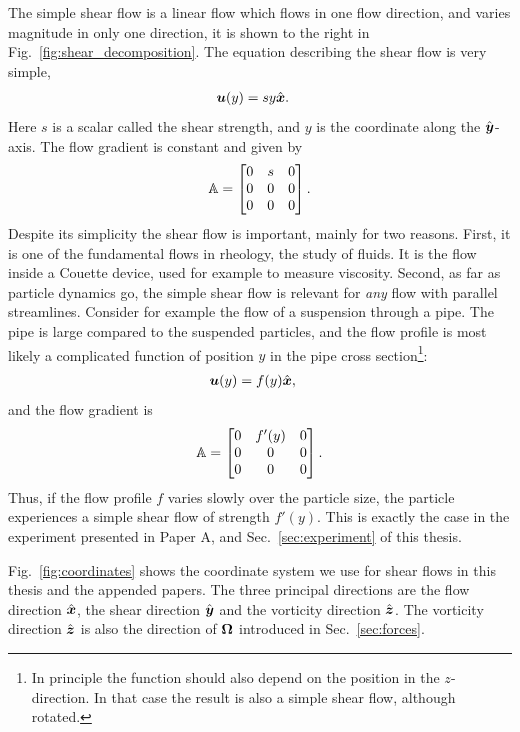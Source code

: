 \documentclass[thesis.tex]{subfiles}
\begin{document}
The simple shear flow is a linear flow which flows in one flow direction, and varies magnitude in only one direction, it is shown to the right in Fig.~\ref{fig:shear_decomposition}. The equation describing the shear flow is very simple,
\begin{align*}
	\mbox{\boldmath$u$}(y) &= s y \hat{\mbox{\boldmath$x$}}.
\end{align*}
Here $s$ is a scalar called the shear strength, and $y$ is the coordinate along the $\hat{\mbox{\boldmath$y$}}$-axis. The flow gradient is constant and given by
\begin{align*}
	\mathbb{A} = \begin{bmatrix}
		0 & s & 0 \\
		0 & 0 & 0 \\
		0 & 0 & 0 
	\end{bmatrix}.
\end{align*}
Despite its simplicity the shear flow is important, mainly for two reasons. First, it is one of the fundamental flows in rheology, the study of fluids. It is the flow inside a Couette device, used for example to measure viscosity. Second, as far as particle dynamics go, the simple shear flow is relevant for \emph{any} flow with parallel streamlines. Consider for example the flow of a suspension through a pipe. The pipe is large compared to the suspended particles, and the flow profile is most likely a complicated function of position $y$ in the pipe cross section\footnote{In principle the function should also depend on the position in the $z$-direction. In that case the result is also a simple shear flow, although rotated.}:
\begin{align*}
	\mbox{\boldmath$u$}(y) &= f(y)\hat{\mbox{\boldmath$x$}},
\end{align*}
 and the flow gradient is
\begin{align*}
	\mathbb{A} = \begin{bmatrix}
		0 & f'(y) & 0 \\
		0 & 0 & 0 \\
		0 & 0 & 0 
	\end{bmatrix}.
\end{align*}
Thus, if the flow profile $f$ varies slowly over the particle size, the particle experiences a simple shear flow of strength $f'(y)$. This is exactly the case in the experiment presented in Paper A, and Sec.~\ref{sec:experiment} of this thesis.

Fig.~\ref{fig:coordinates} shows the coordinate system we use for shear flows in this thesis and the appended papers. The three principal directions are the flow direction $\hat{\mbox{\boldmath$x$}}$, the shear direction $\hat{\mbox{\boldmath$y$}}$ and the vorticity direction $\hat{\mbox{\boldmath$z$}}$. The vorticity direction $\hat{\mbox{\boldmath$z$}}$ is also the direction of $\mbox{\boldmath$\Omega$}$ introduced in Sec.~\ref{sec:forces}.
\end{document}
